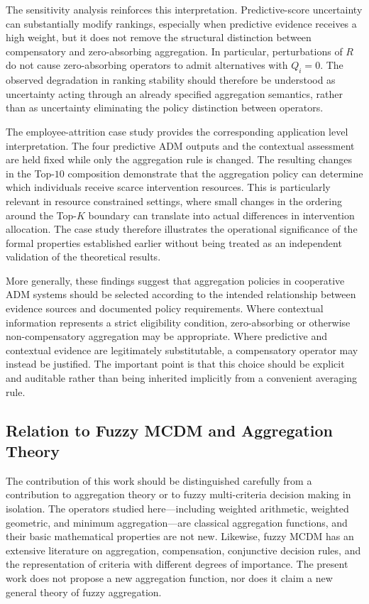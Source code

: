 \documentclass[mathematics,article,submit,moreauthors]{Definitions/mdpi}
\begin{document}
The sensitivity analysis reinforces this interpretation. Predictive-score
uncertainty can substantially modify rankings, especially when predictive
evidence receives a high weight, but it does not remove the structural
distinction between compensatory and zero-absorbing aggregation. In
particular, perturbations of $R$ do not cause zero-absorbing operators to
admit alternatives with $Q_i=0$. The observed degradation in ranking
stability should therefore be understood as uncertainty acting through an
already specified aggregation semantics, rather than as uncertainty
eliminating the policy distinction between operators.

The employee-attrition case study provides the corresponding application
level interpretation. The four predictive ADM outputs and the contextual
assessment are held fixed while only the aggregation rule is changed. The
resulting changes in the Top-$10$ composition demonstrate that the
aggregation policy can determine which individuals receive scarce
intervention resources. This is particularly relevant in resource
constrained settings, where small changes in the ordering around the
Top-$K$ boundary can translate into actual differences in intervention
allocation. The case study therefore illustrates the operational
significance of the formal properties established earlier without being
treated as an independent validation of the theoretical results.

More generally, these findings suggest that aggregation policies in
cooperative ADM systems should be selected according to the intended
relationship between evidence sources and documented policy requirements.
Where contextual information represents a strict eligibility condition,
zero-absorbing or otherwise non-compensatory aggregation may be appropriate.
Where predictive and contextual evidence are legitimately substitutable, a
compensatory operator may instead be justified. The important point is that
this choice should be explicit and auditable rather than being inherited
implicitly from a convenient averaging rule.

\subsection{Relation to Fuzzy MCDM and Aggregation Theory}
\label{subsec:discussion-fuzzy-mcdm}

The contribution of this work should be distinguished carefully from a
contribution to aggregation theory or to fuzzy multi-criteria decision
making in isolation. The operators studied here---including weighted
arithmetic, weighted geometric, and minimum aggregation---are classical
aggregation functions, and their basic mathematical properties are not
new. Likewise, fuzzy MCDM has an extensive literature on aggregation,
compensation, conjunctive decision rules, and the representation of
criteria with different degrees of importance. The present work does not
propose a new aggregation function, nor does it claim a new general theory
of fuzzy aggregation.
\end{document}
